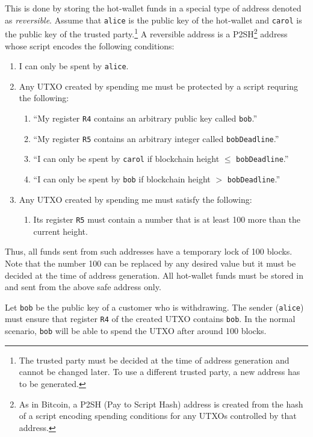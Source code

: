 \documentclass[11pt]{article}
\begin{document}
This is done by storing the hot-wallet funds in a special type of address denoted as {\em reversible}. Assume that \texttt{alice} is the public key of the hot-wallet and \texttt{carol} is the public key of the trusted party.\footnote{The trusted party must be decided at the time of address generation and cannot be changed later. To use a different trusted party, a new address has to be generated.} A reversible address is a P2SH\footnote{As in Bitcoin, a P2SH (Pay to Script Hash) address is created from the hash of a script encoding spending conditions for any UTXOs controlled by that address.} address whose script encodes the following conditions:   
\begin{enumerate}
	\item I can only be spent by \texttt{alice}.
	\item Any UTXO created by spending me must be protected by a script requring the following: 	
	\begin{enumerate}
		\item ``My register \texttt{R4} contains an arbitrary public key called \texttt{bob}.'' 
		\item ``My register \texttt{R5} contains an arbitrary integer called \texttt{bobDeadline}.'' 
		\item ``I can only be spent by \texttt{carol} if blockchain height $\leq$ \texttt{bobDeadline}.''
		\item ``I can only be spent by \texttt{bob} if blockchain height $>$ \texttt{bobDeadline}.''	
    \end{enumerate}  
	\item Any UTXO created by spending me must satisfy the following: 	
	\begin{enumerate}
		\item Its register \texttt{R5} must contain a number that is at least 100 more than the current height. 
	\end{enumerate}  
\end{enumerate}

Thus, all funds sent from such addresses have a temporary lock of 100 blocks. Note that the number 100 can be replaced by any desired value but it must be decided at the time of address generation. All hot-wallet funds must be stored in and sent from the above safe address only. 

Let \texttt{bob} be the public key of a customer who is withdrawing. The sender (\texttt{alice}) must ensure that register \texttt{R4} of the created UTXO contains \texttt{bob}. In the normal scenario, \texttt{bob} will be able to spend the UTXO after around 100 blocks. 
\end{document}
